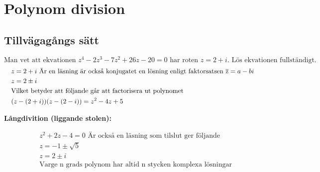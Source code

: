\newpage

\section{Polynom division}
\subsection{Tillvägagångs sätt}
\begin{equation}
   \text{Man vet att ekvationen } z^4 - 2z^3 - 7z^2 + 26z - 20 = 0 \text{ har roten } z = 2 + i \text{. Lös ekvationen fullständigt.}
\end{equation}
\begin{align*}
  &\quad z = 2 + i \text{ Är en läsning är också konjugatet en lösning enligt faktorsatsen } \overline{\rm z}= a - b i \\
  &\quad z = 2 \pm i \\
  &\quad \text{Vilket betyder att följande går att factorisera ut polynomet} \\
  &\quad (z -(2 + i))(z -(2 - i)) = z^2 - 4z + 5 \\
\end{align*}

\textbf{Långdivition (liggande stolen):}\par
{}%

\begin{align*}
  &\quad z^2 + 2z - 4 = 0 \text{ Är också en läsning som tilslut ger följande} \\
  &\quad z = -1 \pm \sqrt{5} \\
  &\quad z = 2 \pm i \\
  &\quad \text{Varge n grads polynom har altid n stycken komplexa lösningar} \\
\end{align*}


\newpage

